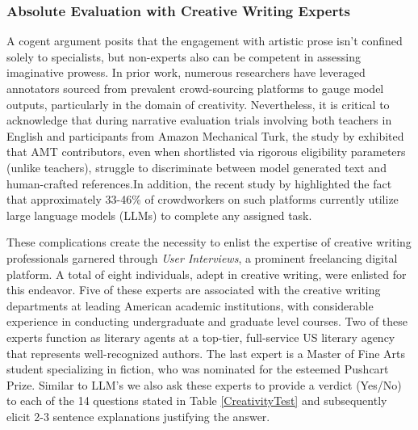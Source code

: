 \subsubsection{Absolute Evaluation with Creative Writing Experts} A cogent argument posits that the engagement with artistic prose isn't confined solely to specialists, but non-experts also can be competent in assessing imaginative prowess. In prior work, numerous researchers have leveraged annotators sourced from prevalent crowd-sourcing platforms to gauge model outputs, particularly in the domain of creativity. Nevertheless, it is critical to acknowledge that during narrative evaluation trials involving both teachers in English and participants from Amazon Mechanical Turk, the study by \cite{karpinska-etal-2021-perils} exhibited that AMT contributors, even when shortlisted via rigorous eligibility parameters (unlike teachers), struggle to discriminate between model generated text and human-crafted references.In addition, the recent study by \cite{veselovsky2023artificial} highlighted the fact that approximately 33-46\% of crowdworkers on such platforms currently utilize large language models (LLMs) to complete any assigned task.

These complications create the necessity to enlist the expertise of creative writing professionals garnered through \textit{User Interviews}, a prominent freelancing digital platform. A total of eight individuals, adept in creative writing, were enlisted for this endeavor. Five of these experts are associated with the creative writing departments at leading American academic institutions, with considerable experience in conducting undergraduate and graduate level courses. Two of these experts function as literary agents at a top-tier, full-service US literary agency that represents well-recognized authors. The last expert is a Master of Fine Arts student specializing in fiction, who was nominated for the esteemed Pushcart Prize. Similar to LLM's we also ask these experts to provide a verdict (Yes/No) to each of the 14 questions stated in Table \ref{CreativityTest} and subsequently elicit 2-3 sentence explanations justifying the answer.

